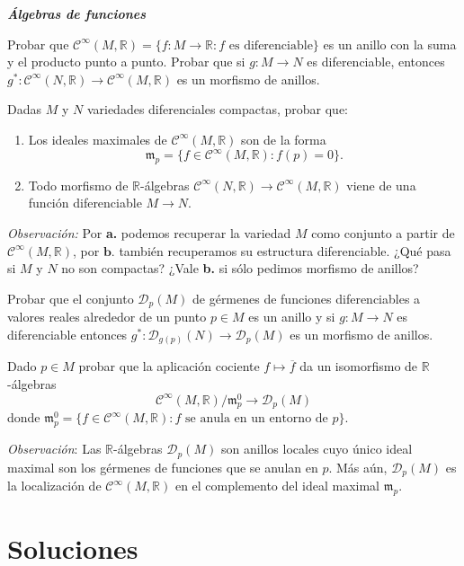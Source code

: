 \documentclass[11pt]{article}
\newcommand{\R}{{\mathbb{R}}}
\numberwithin{theorem}{subsection}
\begin{document}
\textsl{\textbf{\'Algebras de funciones}}
\vspace{1em}


\begin{question}
	Probar que $\mathscr{C}^\infty(M,\R)=\{f:M\to\R:f\text{ es diferenciable}\}$ es un anillo con la suma y el producto punto a punto. Probar que si $g:M\to N$ es diferenciable, entonces $g^*:\mathscr{C}^\infty(N,\R)\to\mathscr{C}^\infty(M,\R)$ es un morfismo de anillos.
\end{question}

\begin{question}
	Dadas $M$ y $N$ variedades diferenciales compactas, probar que:
	\begin{enumerate}
		\item Los ideales maximales de $\mathscr{C}^\infty(M,\R)$ son de la forma $$\mathfrak{m}_p = \{f\in\mathscr{C}^\infty(M,\R): f(p)=0\}.$$
		\item Todo morfismo de $\R$-\'algebras $\mathscr{C}^\infty(N,\R)\to\mathscr{C}^\infty(M,\R)$ viene de una funci\'on diferenciable $M\to N$.
	\end{enumerate}
	\vspace{1em}
	
	
	\noindent \textit{Observaci\'on:} Por \textbf{a.} podemos recuperar la variedad $M$ como conjunto a partir de $\mathscr{C}^\infty(M,\R)$, por $\textbf{b.}$ tambi\'en recuperamos su estructura diferenciable. ¿Qu\'e pasa si $M$ y $N$ no son compactas? ¿Vale \textbf{b.} si s\'olo pedimos morfismo de anillos?
\end{question}

\begin{question}
	Probar que el conjunto $\mathscr{D}_p(M)$ de g\'ermenes de funciones diferenciables a valores reales alrededor de un punto $p\in M$ es un anillo y si $g:M\to N$ es diferenciable entonces $g^*:\mathscr{D}_{g(p)}(N)\to\mathscr{D}_p(M)$ es un morfismo de anillos.
\end{question}

\begin{question}
	Dado $p\in M$ probar que la aplicaci\'on cociente $f\mapsto\overline{f}$ da un isomorfismo de $\R$-\'algebras $$\mathscr{C}^\infty(M,\R)/\mathfrak{m}_p^0\to\mathscr{D}_p(M)$$ donde $\mathfrak{m}_p^0 = \{f\in\mathscr{C}^\infty(M,\R): f \text{ se anula en un entorno de } p\}$.
	\vspace{1em}
	
	\noindent\textit{Observaci\'on}: Las $\R$-\'algebras $\mathscr{D}_p(M)$ son anillos locales cuyo \'unico ideal maximal son los g\'ermenes de funciones que se anulan en $p$. M\'as a\'un, $\mathscr{D}_p(M)$ es la localizaci\'on de $\mathscr{C}^\infty(M,\R)$ en el complemento del ideal maximal $\mathfrak{m}_p$.
\end{question}

\section{Soluciones}

\printsolutions
\end{document}
